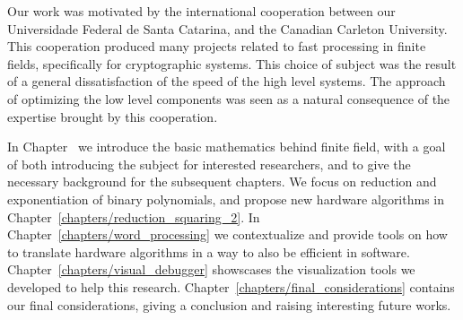 Our work was motivated by the international cooperation between our Universidade Federal de Santa Catarina, and the Canadian Carleton University. This cooperation produced many projects related to fast processing in finite fields, specifically for cryptographic systems. This choice of subject was the result of a general dissatisfaction of the speed of the high level systems. The approach of optimizing the low level components was seen as a natural consequence of the expertise brought by this cooperation.

In Chapter~\label{cap:background} we introduce the basic mathematics behind finite field, with a goal of both introducing the subject for interested researchers, and to give the necessary background for the subsequent chapters. We focus on reduction and exponentiation of binary polynomials, and propose new hardware algorithms in Chapter~\ref{chapters/reduction_squaring_2}. In Chapter~\ref{chapters/word_processing} we contextualize and provide tools on how to translate hardware algorithms in a way to also be efficient in software. Chapter~\ref{chapters/visual_debugger} showscases the visualization tools we developed to help this research. Chapter~\ref{chapters/final_considerations} contains our final considerations, giving a conclusion and raising interesting future works.


%
%
%
%
